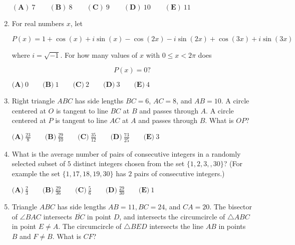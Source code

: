 \documentclass{article}
\begin{document}
\begin{enumerate}[label=\arabic*., itemsep=0.5em]
\((\textbf{A})\: 7\qquad(\textbf{B}) \: 8\qquad(\textbf{C}) \: 9\qquad(\textbf{D}) \: 10\qquad(\textbf{E}) \: 11\)\par \vspace{0.5em}\item For real numbers \(x\), let 

\begin{equation*}
P(x)=1+\cos(x)+i\sin(x)-\cos(2x)-i\sin(2x)+\cos(3x)+i\sin(3x)
\end{equation*}

where \(i = \sqrt{-1}\). For how many values of \(x\) with \(0\leq x<2\pi\) does 

\begin{equation*}
P(x)=0?
\end{equation*}


\(\textbf{(A)}\ 0 \qquad\textbf{(B)}\  1 \qquad\textbf{(C)}\  2 \qquad\textbf{(D)}\
3 \qquad\textbf{(E)}\ 4\)\par \vspace{0.5em}\item Right triangle \(ABC\) has side lengths \(BC=6\), \(AC=8\), and \(AB=10\). A circle centered at \(O\) is tangent to line \(BC\) at \(B\) and passes through \(A\). A circle centered at \(P\) is tangent to line \(AC\) at \(A\) and passes through \(B\). What is \(OP\)?

\(\textbf{(A)}\ \frac{23}{8} \qquad\textbf{(B)}\  \frac{29}{10} \qquad\textbf{(C)}\  \frac{35}{12} \qquad\textbf{(D)}\
\frac{73}{25} \qquad\textbf{(E)}\ 3\)\par \vspace{0.5em}\item What is the average number of pairs of consecutive integers in a randomly selected subset of \(5\) distinct integers chosen from the set \(\{ 1, 2, 3, , 30\}\)? (For example the set \(\{1, 17, 18, 19, 30\}\) has \(2\) pairs of consecutive integers.)

\(\textbf{(A)}\ \frac{2}{3} \qquad\textbf{(B)}\ \frac{29}{36} \qquad\textbf{(C)}\ \frac{5}{6} \qquad\textbf{(D)}\
\frac{29}{30} \qquad\textbf{(E)}\ 1\)\par \vspace{0.5em}\item Triangle \(ABC\) has side lengths \(AB = 11, BC=24\), and \(CA = 20\). The bisector of \(\angle{BAC}\) intersects \(\overline{BC}\) in point \(D\), and intersects the circumcircle of \(\triangle{ABC}\) in point \(E \ne A\). The circumcircle of \(\triangle{BED}\) intersects the line \(AB\) in points \(B\) and \(F \ne B\). What is \(CF\)?


\end{enumerate}
\end{document}
